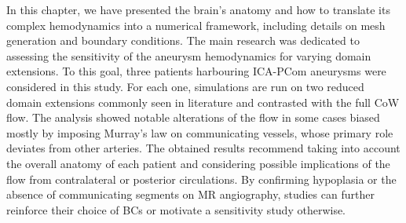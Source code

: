 \begin{tcolorbox}[conclusions]

	In this chapter, we have presented the brain's anatomy and how to translate its complex hemodynamics into a numerical framework, including details on mesh generation and boundary conditions. The main research was dedicated to assessing the sensitivity of the aneurysm hemodynamics for varying domain extensions. To this goal, three patients harbouring ICA-PCom aneurysms were considered in this study. For each one, simulations are run on two reduced domain extensions commonly seen in literature and contrasted with the full CoW flow. The analysis showed notable alterations of the flow in some cases biased mostly by imposing Murray's law on communicating vessels, whose primary role deviates from other arteries. The obtained results recommend taking into account the overall anatomy of each patient and considering possible implications of the flow from contralateral or posterior circulations. By confirming hypoplasia or the absence of communicating segments on MR angiography, studies can further reinforce their choice of BCs or motivate a sensitivity study otherwise.

\end{tcolorbox}

\newpage

{\footnotesize
	}